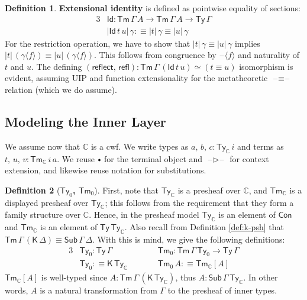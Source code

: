 \documentclass[12pt,a4paper,twoside,openany]{book}
\theoremstyle{remark}
\theoremstyle{definition}
\newtheorem{mydefinition}{Definition}
\theoremstyle{theorem}
\newcommand{\mbb}[1]{\mathbb{#1}}
\newcommand{\refl}{\mathsf{refl}}
\newcommand{\reflect}{\mathsf{reflect}}
\newcommand{\Con}{\mathsf{Con}}
\newcommand{\Sub}{\mathsf{Sub}}
\newcommand{\Tm}{\mathsf{Tm}}
\newcommand{\Ty}{\mathsf{Ty}}
\newcommand{\Id}{\mathsf{Id}}
\newcommand{\blank}{\mathord{\hspace{1pt}\text{--}\hspace{1pt}}}
\newcommand{\ext}{\triangleright}
\newcommand{\emptycon}{\scaleobj{.75}\bullet}
\newcommand{\K}{\mathsf{K}}
\newcommand{\mbbC}{\mbb{C}}
\newcommand{\lab}{\langle}
\newcommand{\rab}{\rangle}
\newcommand{\defn}{:\equiv}
\begin{document}
\begin{mydefinition}
\textbf{Extensional identity} is defined as pointwise equality of sections:
\begin{alignat*}{3}
  & \Id : \Tm\,\Gamma\,A \to \Tm\,\Gamma\,A \to \Ty\,\Gamma\\
  & |\Id\,t\,u|\,\gamma \defn |t|\,\gamma \equiv |u|\,\gamma
\end{alignat*}
For the restriction operation, we have to show that $|t|\,\gamma \equiv |u|\,\gamma$
implies $|t|\,(\gamma\lab f \rab) \equiv |u|\,(\gamma \lab f \rab)$. This
follows from congruence by $\blank \lab f \rab$ and naturality of $t$ and
$u$.  The defining $(\reflect,\,\refl) : \Tm\,\Gamma\,(\Id\,t\,u) \simeq (t \equiv
u)$ isomorphism is evident, assuming UIP and function extensionality for the
metatheoretic $\blank\!\equiv\!\blank$ relation (which we do assume).
\end{mydefinition}

\subsection{Modeling the Inner Layer}

We assume now that $\mbbC$ is a cwf. We write types as $a,\,b,\,c :
\Ty_\mbbC\,i$ and terms as $t,\,u,\,v : \Tm_\mbbC\,i\,a$. We reuse $\emptycon$
for the terminal object and $\blank\ext\blank$ for context extension, and
likewise reuse notation for substitutions.

\begin{mydefinition}[\textbf{$\Ty_{0}$, $\Tm_{0}$}]
\label{def:psh-ty0-tm0}
First, note that $\Ty_{\mbbC}$ is a presheaf over $\mbbC$, and $\Tm_{\mbbC}$ is
a displayed presheaf over $\Ty_{\mbbC}$; this follows from the requirement that
they form a family structure over $\mbbC$. Hence, in the presheaf model
$\Ty_{\mbbC}$ is an element of $\Con$ and $\Tm_{\mbbC}$ is an element of
$\Ty\,\Ty_{\mbbC}$. Also recall from Definition \ref{def:k-psh} that
$\Tm\,\Gamma\,(\K\,\Delta) \equiv \Sub\,\Gamma\,\Delta$. With this is mind, we
give the following definitions:
\begin{alignat*}{3}
  & \Ty_0 : \Ty\,\Gamma                   && \Tm_0 : \Tm\,\Gamma\,\Ty_0 \to \Ty\,\Gamma\\
  & \Ty_0 \defn \K\,\Ty_{\mbbC}\hspace{2em} && \Tm_0\,A \defn \Tm_{\mbbC}[A]
\end{alignat*}
$\Tm_{\mbbC}[A]$ is well-typed since $A : \Tm\,\Gamma\,(\K\,\Ty_{\mbbC})$, thus
$A : \Sub\,\Gamma\,\Ty_{\mbbC}$. In other words, $A$ is a natural transformation
from $\Gamma$ to the presheaf of inner types.
\end{mydefinition}
\end{document}
